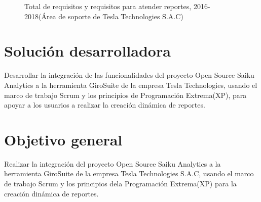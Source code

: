\begin{spacing}{1.5}
	\begin{figure}[H]
		\begin{center}
			\tikzI
		\end{center}
		\caption {\centering \small{Total de requisitos y requisitos para atender reportes,  2016-2018(\'{A}rea de soporte de Tesla Technologies S.A.C)}} \label{figure:chaperI_1}
	\end{figure}
	
\end{spacing}

\clearpage
\section{Soluci\'{o}n desarrolladora}
\begin{spacing}{1.5}
	Desarrollar la integraci\'{o}n de las funcionalidades del proyecto Open Source Saiku Analytics a la herramienta GiroSuite de la empresa Tesla Technologies, usando el marco de trabajo Scrum y los principios de Programaci\'{o}n Extrema(XP), para apoyar a los usuarios a realizar la creaci\'{o}n din\'{a}mica de reportes.
\end{spacing}
\section{Objetivo general}
\begin{spacing}{1.5}
	Realizar la integraci\'{o}n del proyecto Open Source Saiku Analytics a la herramienta GiroSuite de la empresa Tesla Technologies S.A.C, usando el marco de trabajo Scrum y los principios dela Programaci\'{o}n Extrema(XP) para la creaci\'{o}n din\'{a}mica de reportes.
\end{spacing}

